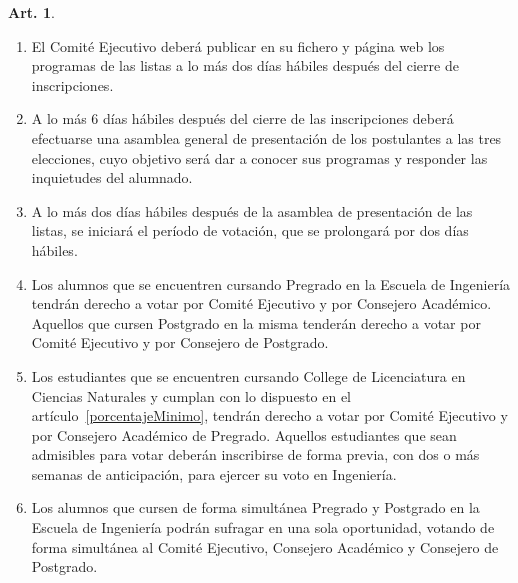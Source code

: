 \documentclass[letterpaper,11pt]{article}
\theoremstyle{definition}%
\newtheorem{art}{Art.} %
\begin{document}
\begin{art}
\begin{enumerate}
		\item El Comité Ejecutivo deberá publicar en su fichero y página web los programas de las listas a lo más dos días hábiles después del cierre de inscripciones.

		\item A lo más 6 días hábiles después del cierre de las inscripciones deberá efectuarse una asamblea general de presentación de los postulantes a las tres elecciones, cuyo objetivo será dar a conocer sus programas y responder las inquietudes del alumnado.

		\item \label{periodo}A lo más dos días hábiles después de la asamblea de presentación de las listas, se iniciará el período de votación, que se prolongará por dos días hábiles.

		\item \label{votantes}Los alumnos que se encuentren cursando Pregrado en la Escuela de Ingeniería tendrán derecho a votar por Comité Ejecutivo y por Consejero Académico. Aquellos que cursen Postgrado en la misma tenderán derecho a votar por Comité Ejecutivo y por Consejero de Postgrado.

		\item \label{votantesCollege} Los estudiantes que se encuentren cursando College de Licenciatura en Ciencias Naturales y cumplan con lo dispuesto en el artículo~\ref{porcentajeMinimo}, tendrán derecho a votar por Comité Ejecutivo y por Consejero Académico de Pregrado. Aquellos estudiantes que sean admisibles para votar deberán inscribirse de forma previa, con dos o más semanas de anticipación, para ejercer su voto en Ingeniería.

		\item Los alumnos que cursen de forma simultánea Pregrado y Postgrado en la Escuela de Ingeniería podrán sufragar en una sola oportunidad, votando de forma simultánea al Comité Ejecutivo, Consejero Académico y Consejero de Postgrado.


\end{enumerate}
\end{art}
\end{document}
